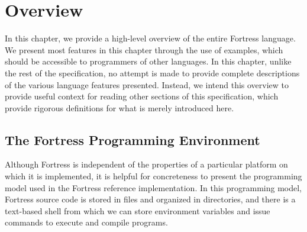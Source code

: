 %
%
%
%

\chapter{Overview}


In this chapter, we provide a high-level overview of the entire Fortress
language. We present most features in this chapter through the use of examples,
which should be accessible to programmers of other languages.
In this chapter, unlike the rest of the specification,
no attempt is made to provide complete descriptions
of the various language features presented. Instead, we intend this overview to
provide useful context for reading other sections of this specification,
which provide rigorous definitions for what is merely
introduced here.

\section{The Fortress Programming Environment}


Although Fortress is independent of the properties of a particular
platform on which it is implemented, it is helpful for concreteness
to present the programming model used in the Fortress reference implementation.
In this programming model,
Fortress source code is stored in files and organized in
directories, and there is a text-based shell from which we can store
environment variables and issue commands to execute and compile
programs.

